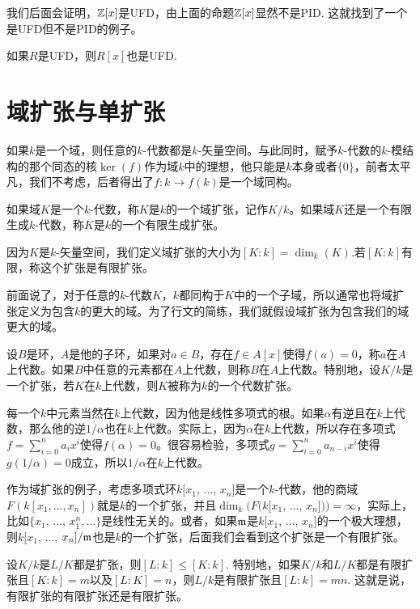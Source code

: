 我们后面会证明，$\mathbb{Z}[x]$是UFD，由上面的命题$\mathbb{Z}[x]$显然不是PID. 这就找到了一个是UFD但不是PID的例子。

\begin{thm}
如果$R$是UFD，则$R[x]$也是UFD.
\end{thm}

\section{域扩张与单扩张}

如果$k$是一个域，则任意的$k$-代数都是$k$-矢量空间。与此同时，赋予$k$-代数的$k$-模结构的那个同态的核$\ker(f)$作为域$k$中的理想，他只能是$k$本身或者$\{0\}$，前者太平凡，我们不考虑，后者得出了$f:k\to f(k)$是一个域同构。

\para 如果域$K$是一个$k$-代数，称$K$是$k$的一个域扩张，记作$K/k$。如果域$K$还是一个有限生成$k$-代数，称$K$是$k$的一个有限生成扩张。

因为$K$是$k$-矢量空间，我们定义域扩张的大小为$[K:k]=\dim_k(K)$.若$[K:k]$有限，称这个扩张是有限扩张。
\endpara

前面说了，对于任意的$k$-代数$K$，$k$都同构于$K$中的一个子域，所以通常也将域扩张定义为包含$k$的更大的域。为了行文的简练，我们就假设域扩张为包含我们的域更大的域。

\para 设$B$是环，$A$是他的子环，如果对$a\in B$，存在$f\in A[x]$使得$f(a)=0$，称$a$在$A$上代数。如果$B$中任意的元素都在$A$上代数，则称$B$在$A$上代数。特别地，设$K/k$是一个扩张，若$K$在$k$上代数，则$K$被称为$k$的一个代数扩张。\endpara

每一个$k$中元素当然在$k$上代数，因为他是线性多项式的根。如果$\alpha$有逆且在$k$上代数，那么他的逆$1/\alpha$也在$k$上代数。实际上，因为$\alpha$在$k$上代数，所以存在多项式$f=\sum_{i=0}^na_ix^i$使得$f(\alpha)=0$。很容易检验，多项式$g=\sum_{i=0}^na_{n-i}x^i$使得$g(1/\alpha)=0$成立，所以$1/\alpha$在$k$上代数。

作为域扩张的例子，考虑多项式环$k[x_1$, $\dots$, $x_n]$是一个$k$-代数，他的商域$F(k[x_1,\dots,x_n])$就是$k$的一个扩张，并且$\dim_k(F(k[x_1$, $\dots$, $x_n]))=\infty$，实际上，比如$\{x_1$, $\dots$, $x_1^n,\dots\}$是线性无关的。或者，如果$\mathfrak{m}$是$k[x_1$, $\dots$, $x_n]$的一个极大理想，则$k[x_1$, $\dots$, $x_n]/\mathfrak{m}$也是$k$的一个扩张，后面我们会看到这个扩张是一个有限扩张。

\begin{pro}
设$K/k$是$L/K$都是扩张，则$[L:k]\leq[K:k]$. 特别地，如果$K/k$和$L/K$都是有限扩张且$[K:k]=m$以及$[L:K]=n$，则$L/k$是有限扩张且$[L:k]=mn$. 这就是说，有限扩张的有限扩张还是有限扩张。
\end{pro}

